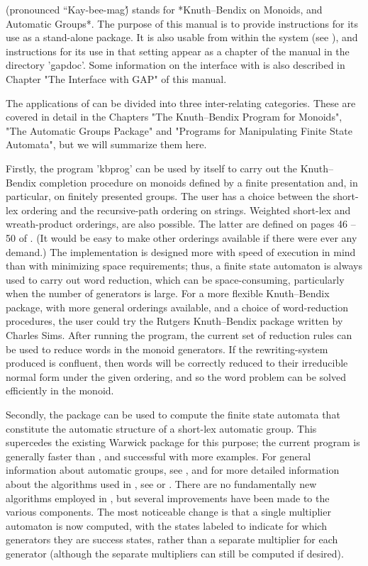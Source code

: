 {\KBMAG} (pronounced ``Kay-bee-mag\'\')
stands for *Knuth--Bendix on Monoids, and Automatic Groups*.
The purpose of this manual is to provide instructions for its use as a
stand-alone package.  It is also usable from within the {\GAP} system (see
\cite{Sch92}), and instructions for its use in that setting appear as a
chapter of the {\GAP} manual in the directory 'gapdoc'.
Some information on the interface with {\GAP} is also described in Chapter
"The Interface with GAP" of this manual.

The applications of {\KBMAG} can be divided into three inter-relating
categories. These are covered in detail in the Chapters
"The Knuth--Bendix Program for Monoids",
"The Automatic Groups Package" and
"Programs for Manipulating Finite State Automata",
but we will summarize them here.

Firstly, the program 'kbprog' can be used by itself to carry out the
Knuth--Bendix completion procedure on monoids defined by a finite presentation
and, in particular, on finitely presented groups. The user has a choice
between the short-lex ordering and the recursive-path ordering on strings.
Weighted short-lex and wreath-product orderings, are also possible.
The latter are defined on pages 46 -- 50 of \cite{Sims94}.
(It would be easy to make other orderings available if there were ever any
demand.) The implementation is designed more with speed of execution in mind
than with minimizing space requirements; thus, a finite state automaton is
always used to carry out word reduction, which can be space-consuming,
particularly when the number of generators is large. For a more flexible
Knuth--Bendix package, with more general orderings available, and a
choice of word-reduction procedures, the user could try the Rutgers
Knuth--Bendix package {\rkbp} written by Charles Sims. 
After running the program, the current set of reduction rules can be used to
reduce words in the monoid generators. If the rewriting-system produced is
confluent, then words will be correctly reduced to their irreducible normal
form under the given ordering, and so the word problem can be solved efficiently
in the monoid.

Secondly, the package can be used to compute the finite state automata
that constitute the automatic structure of a short-lex automatic group.
This supercedes the existing Warwick {\Automata} package for this purpose;
the current program is generally faster than {\Automata}, and successful with
more examples. For general information about automatic groups, see
\cite{ECHLPT92}, and for more detailed information about the algorithms
used in {\Automata}, see \cite{EHR91} or \cite{Holt94}. There are 
no fundamentally new algorithms employed in {\KBMAG}, but several
improvements have been made to the various components. The most
noticeable change is that a single multiplier automaton is now computed,
with the states labeled to indicate for which generators they are success
states, rather than a separate multiplier for each generator (although the
separate multipliers can still be computed if desired).

